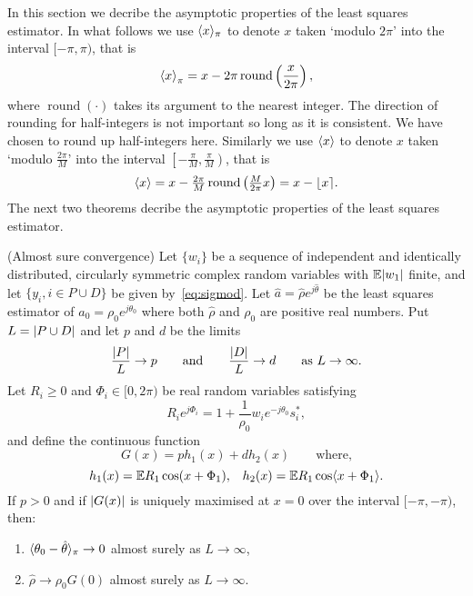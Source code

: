 \documentclass[journal]{IEEEtran}
\begin{document}
In this section we decribe the asymptotic properties of the least squares estimator.  In what follows we use $\langle x \rangle_\pi$ to denote $x$ taken `modulo $2\pi$' into the interval $[-\pi, \pi)$, that is
\[
\left\langle x \right\rangle_\pi = x - 2\pi\operatorname{round}\left(\frac{x}{2\pi}\right),
\]
where $\operatorname{round}(\cdot)$ takes its argument to the nearest integer.  The direction of rounding for half-integers is not important so long as it is consistent.  We have chosen to round up half-integers here.  Similarly we use $\langle x \rangle$ to denote $x$ taken `modulo $\tfrac{2\pi}{M}$' into the interval $\left[-\tfrac{\pi}{M}, \tfrac{\pi}{M}\right)$, that is
\[
\left\langle x \right\rangle = x - \tfrac{2\pi}{M}\operatorname{round}\left(\tfrac{M}{2\pi}x\right) = x - {\left\lfloor x \right\rceil}.
\]
The next two theorems decribe the asymptotic properties of the least squares estimator.

\begin{theorem}\label{thm:consistency} (Almost sure convergence)
Let $\{w_i\}$ be a sequence of independent and identically distributed, circularly symmetric complex random variables with ${\mathbb E} {\left\vert w_1 \right\vert}$ finite, and let $\{y_i, i \in P \cup D\}$ be given by~\eqref{eq:sigmod}.   Let $\hat{a} = \hat{\rho}e^{j\hat{\theta}}$ be the least squares estimator of $a_0 = \rho_0e^{j\theta_0}$ where both $\hat{\rho}$ and $\rho_0$ are positive real numbers.  Put $L = {\left\vert P \cup D \right\vert}$ and let $p$ and $d$ be the limits
\[
\frac{{\left\vert P \right\vert}}{L} \rightarrow p \qquad \text{and} \qquad \frac{{\left\vert D \right\vert}}{L} \rightarrow d \qquad \text{as $L \rightarrow \infty$.}
\] 
Let $R_i \geq 0$ and $\Phi_i \in [0,2\pi)$ be real random variables satisfying
\begin{equation}\label{eq:RiandPhii}
R_ie^{j\Phi_i} = 1 + \frac{1}{\rho_0} w_i e^{-j\theta_0} s_i^*,
\end{equation}
and define the continuous function
\[
G(x) = p h_1(x) + d h_2(x) \qquad \text{where,}
\]
\[
h_1(x) = {\mathbb E} R_1 \cos(x + \Phi_1), \;\;\; h_2(x) =  {\mathbb E} R_1 \cos\langle  x + \Phi_1 \rangle.
\]
If $p > 0$ and if ${\left\vert G(x) \right\vert}$ is uniquely maximised at $x = 0$ over the interval $[-\pi,-\pi)$, then:
\begin{enumerate}
\item $\langle \theta_0 - \hat{\theta} \rangle_\pi \rightarrow 0$ almost surely as $L \rightarrow \infty$,
\item $\hat{\rho} \rightarrow \rho_0 G(0)$ almost surely as $L \rightarrow \infty$.
\end{enumerate}
\end{theorem}
\end{document}
